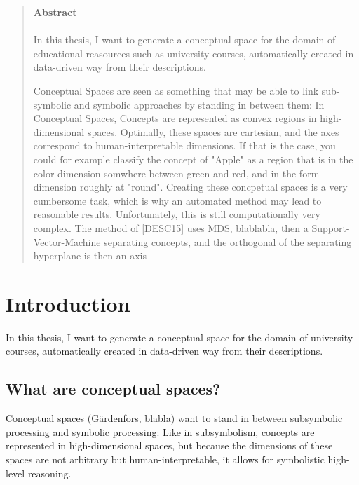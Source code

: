 \documentclass[11pt,
  paper=a4, 
  hidelinks,
  bibliography=totocnumbered,
	captions=tableheading,
	BCOR=10mm
]{scrreprt}
\theoremstyle{definition}
\begin{document}
\begin{abstract}
	\textbf{\LARGE{Abstract}}\\\\
	In this thesis, I want to generate a conceptual space for the domain of educational reasources such as university courses, automatically created in data-driven way from their descriptions.

	Conceptual Spaces are seen as something that may be able to link sub-symbolic and symbolic approaches by standing in between them: In Conceptual Spaces, Concepts are represented as convex regions in high-dimensional spaces. Optimally, these spaces are cartesian, and the axes correspond to human-interpretable dimensions. If that is the case, you could for example classify the concept of "Apple" as a region that is in the color-dimension somwhere between green and red, and in the form-dimension roughly at "round".
	Creating these concpetual spaces is a very cumbersome task, which is why an automated method may lead to reasonable results. Unfortunately, this is still computationally very complex.
	The method of [DESC15] uses MDS, blablabla, then a Support-Vector-Machine separating concepts, and the orthogonal of the separating hyperplane is then an axis
\end{abstract}




\tableofcontents
\listoffigures
\listoftables
\listofalgorithms


\chapter{Introduction}


In this thesis, I want to generate a conceptual space for the domain of university courses, automatically created in data-driven way from their descriptions.

\section{What are conceptual spaces? }

Conceptual spaces (Gärdenfors, blabla) want to stand in between subsymbolic processing and symbolic processing: Like in subsymbolism, concepts are represented in high-dimensional spaces, but because the dimensions of these spaces are not arbitrary but human-interpretable, it allows for symbolistic high-level reasoning.
\end{document}

